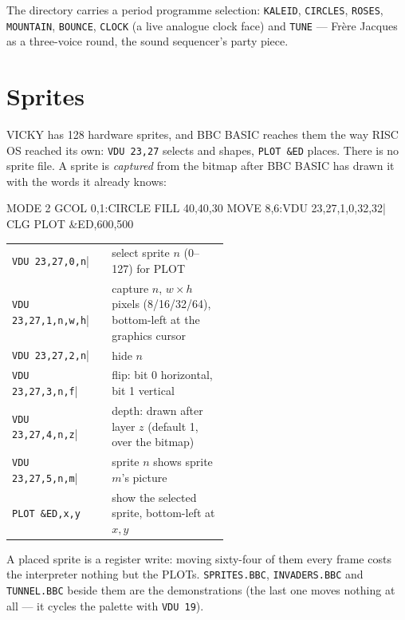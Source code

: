 The  directory carries a period programme
selection:
\texttt{KALEID}, \texttt{CIRCLES}, \texttt{ROSES}, \texttt{MOUNTAIN},
\texttt{BOUNCE}, \texttt{CLOCK} (a live analogue clock face) and
\texttt{TUNE} --- Fr\`ere Jacques as a three-voice round, the sound
sequencer's party piece.

\section{Sprites}
VICKY has 128 hardware sprites, and BBC BASIC reaches them the way RISC OS
reached its own: \verb|VDU 23,27| selects and shapes, \verb|PLOT &ED|
places. There is no sprite file. A sprite is \emph{captured} from the
bitmap after BBC BASIC has drawn it with the words it already knows:

\begin{type}
MODE 2
GCOL 0,1:CIRCLE FILL 40,40,30
MOVE 8,6:VDU 23,27,1,0,32,32|
CLG
PLOT &ED,600,500
\end{type}

\small
\begin{tabular}{@{}l >{\raggedright\arraybackslash}p{0.54\linewidth}@{}}
\verb|VDU 23,27,0,n|| & select sprite $n$ (0--127) for PLOT \\
\verb|VDU 23,27,1,n,w,h|| & capture $n$, $w\times h$ pixels (8/16/32/64), bottom-left at the graphics cursor \\
\verb|VDU 23,27,2,n|| & hide $n$ \\
\verb|VDU 23,27,3,n,f|| & flip: bit 0 horizontal, bit 1 vertical \\
\verb|VDU 23,27,4,n,z|| & depth: drawn after layer $z$ (default 1, over the bitmap) \\
\verb|VDU 23,27,5,n,m|| & sprite $n$ shows sprite $m$'s picture \\
\verb|PLOT &ED,x,y| & show the selected sprite, bottom-left at $x,y$ \\
\end{tabular}
\normalsize

A placed sprite is a register write: moving sixty-four of them every frame
costs the interpreter nothing but the PLOTs. \texttt{SPRITES.BBC},
\texttt{INVADERS.BBC} and \texttt{TUNNEL.BBC} beside them are
the demonstrations (the last one moves nothing at all --- it cycles the
palette with \verb|VDU 19|).

